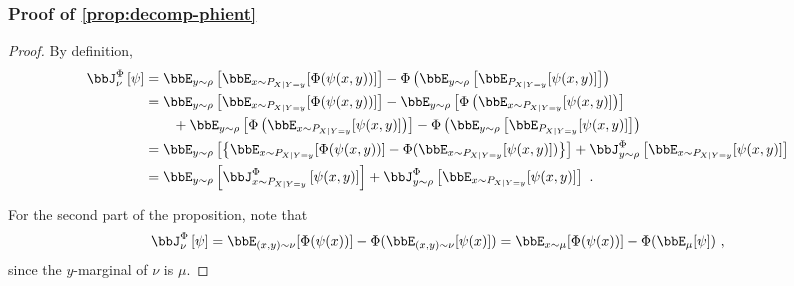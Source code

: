 \documentclass[11pt]{article}
\newcounter{ct}
\newcommand{\Phient}[3]{
    \ensuremath{\if$#3$\bbJ_{#1}^{#2}\else\bbJ_{#1}^{#2}\left[#3\right]\fi}}
\begin{document}
\subsubsection{Proof of \cref{prop:decomp-phient}}
\begin{proof}
By definition,
\begin{align*}
    \Phient{\nu}{\Phi}{\psi} &= \bbE_{y \sim \rho}\left[\bbE_{x \sim P_{X | Y = y}}[\Phi(\psi(x, y))]\right] - \Phi\left(\bbE_{y \sim \rho}\left[\bbE_{P_{X | Y = y}}[\psi(x, y)]\right]\right) \\
    &= \bbE_{y \sim \rho}\left[\bbE_{x \sim P_{X | Y = y}}[\Phi(\psi(x, y))]\right] - \bbE_{y \sim \rho}\left[ \Phi\left(\bbE_{x \sim P_{X | Y = y}}[\psi(x, y)]\right)\right] \\
    &\qquad + \bbE_{y \sim \rho}\left[ \Phi\left(\bbE_{x \sim P_{X | Y = y}}[\psi(x, y)]\right)\right] - \Phi\left(\bbE_{y \sim \rho}\left[\bbE_{P_{X | Y = y}}[\psi(x, y)]\right]\right) \\
    &= \bbE_{y \sim \rho}\left[\left\{\bbE_{x \sim P_{X | Y = y}}[\Phi(\psi(x, y))] - \Phi(\bbE_{x \sim P_{X | Y = y}}[\psi(x, y)])\right\}\right] + \Phient{y \sim \rho}{\Phi}{\bbE_{x \sim P_{X | Y = y}}[\psi(x, y)]} \\
    &= \bbE_{y \sim \rho}\left[\Phient{x \sim P_{X | Y = y}}{\Phi}{\psi(x, y)}\right] + \Phient{y \sim \rho}{\Phi}{\bbE_{x \sim P_{X | Y = y}}[\psi(x, y)]}~.
\end{align*}

For the second part of the proposition, note that
\begin{equation*}
    \Phient{\nu}{\Phi}{\psi} = \bbE_{(x, y) \sim \nu}[\Phi(\psi(x))] - \Phi(\bbE_{(x, y) \sim \nu}[\psi(x)]) = \bbE_{x \sim \mu}[\Phi(\psi(x))] - \Phi(\bbE_{\mu}[\psi])~,
\end{equation*}
since the \(y\)-marginal of \(\nu\) is \(\mu\).
\end{proof}
\end{document}
